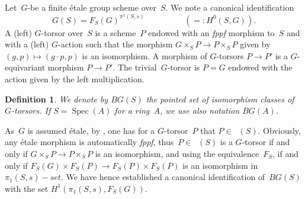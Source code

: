 \documentclass[a4paper,english,12pt]{amsart}
\DeclareMathOperator{\Ab}{Ab}
\DeclareMathOperator{\Hom}{Hom}
\DeclareMathOperator{\Spec}{Spec}
\DeclareMathOperator\et{\acute et}
\newtheorem{mydef}[equation]{Definition}
\numberwithin{equation}{subsection}
\begin{document}
Let~$G$-be a finite \' etale group scheme over~$S$. We note a canonical identification $$G(S)=F_S(G)^{\pi^1(S,s)}\hspace{2cm} (=:H^0(S, G)).$$ A (left) $G$-torsor over~$S$ is a scheme~$P$ endowed with an {\it fppf} morphism to~$S$ and  with a (left) $G$-action such that the morphism $G\times _SP\to P\times _SP$ given by $(g, p)\mapsto (g\cdot p, p)$ is an isomorphism. A morphism of $G$-torsors $P\to P'$ is a $G$-equivariant morphism $P\to P'$. The trivial~$G$-torsor is $P=G$ endowed with the action given by the left multiplication.
\begin{mydef}
We denote by $BG(S)$ the pointed set of isomorphism classes of $G$-torsors. If $S=\Spec(A)$ for a ring~$A$, we use also notation $BG(A)$.
\end{mydef} 
 As~$G$ is assumed \' etale, by \cite[Chapter III, Proposition 4.2]{Milne}, one has for a $G$-torsor~$P$ that $P\in\et (S)$. Obviously, any \' etale morphism is automatically {\it fppf}, thus~$P\in\et(S)$ is a $G$-torsor if and only if $G\times_S P\to P\times_S P$ is an isomorphism, and using the equivalence~$F_S$, if and only if $F_S(G)\times F_S(P)\to F_S(P)\times F_S(P)$ is an isomorphism in $\pi_1(S,s)-set$. We have hence established a canonical identification of~$BG(S)$ with the set $H^1(\pi_1(S,s), F_S(G))$. %
\end{document}
